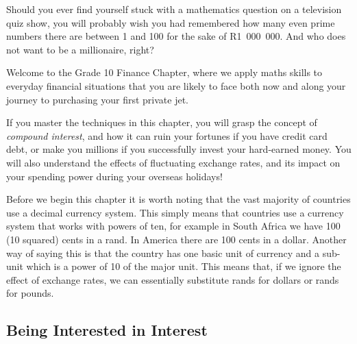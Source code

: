       
      \label{m39332*id66349}Should you ever find yourself stuck with a mathematics question on a television quiz show, you will probably wish you had remembered how many even prime numbers there are between 1 and 100 for the sake of R1~000~000. And who does not want to be a millionaire, right?\par 
      \label{m39332*id66356}Welcome to the Grade 10 Finance Chapter, where we apply maths skills to everyday financial situations that you are likely to face both now and along your journey to purchasing your first private jet.\par 
      \label{m39332*id66361}If you master the techniques in this chapter, you will grasp the concept of \textsl{compound interest}, and how it can ruin your fortunes if you have credit card debt, or make you millions if you successfully invest your hard-earned money. You will also understand the effects of fluctuating exchange rates, and its impact on your spending power during your overseas holidays!\par \label{m39332*eip-810}Before we begin this chapter it is worth noting that the vast majority of countries use a decimal currency system. This simply means that countries use a currency system that works with powers of ten, for example in South Africa we have 100 (10 squared) cents in a rand. In America there are 100 cents in a dollar. Another way of saying this is that the country has one basic unit of currency and a sub-unit which is a power of 10 of the major unit. This means that, if we ignore the effect of exchange rates, we can essentially substitute rands for dollars or rands for pounds.\par 
    
  
    \label{m39332*cid4}
            \subsection{ Being Interested in Interest}
            \nopagebreak
            
